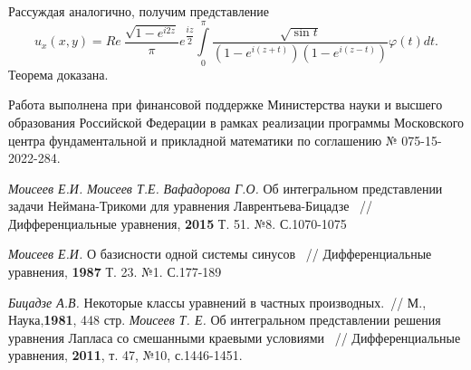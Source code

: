 \documentclass[a4paper, 9pt]{article}
\begin{document}
	 	Рассуждая аналогично, получим представление
	 		\begin{equation*}
	 			u_x(x,y) = Re\   \dfrac{ \sqrt{1 - e^{i2z}} }{\pi} e^{\dfrac{iz}{2}} \int\limits_0^\pi  \dfrac{\sqrt{\sin{t}}}{\left(1 - e^{i(z+t)} \right) \left(1 - e^{i(z-t)}\right)}  \varphi(t) dt.
	 		\end{equation*}
		Теорема доказана.
	\par
	Работа выполнена при финансовой поддержке Министерства науки и высшего образования Российской Федерации в рамках реализации программы Московского центра фундаментальной и прикладной математики по соглашению № 075-15-2022-284.
	\newline
	\newline
	\vspace{-2.3cm}
	\renewcommand{\refname}{\begin{center}
			{\normalsize \rm СПИСОК ЛИТЕРАТУРЫ} \end{center}}
	
	\begin{thebibliography}{99} \itemsep=-2pt \vspace{-0.8cm}
		
		
		 \textit{Моисеев Е.И.} \textit{Моисеев Т.Е.} \textit{Вафадорова Г.О.} Об интегральном представлении задачи Неймана-Трикоми для уравнения Лаврентьева-Бицадзе ~// Дифференциальные уравнения, \textbf{2015} Т. 51. №8. С.1070-1075
		
		 \textit{Моисеев Е.И.} О базисности одной системы синусов ~// Дифференциальные уравнения, \textbf{1987} Т. 23. №1. С.177-189
		
		 \textit{Бицадзе А.В.} Некоторые классы уравнений в частных производных.~// М., Наука,\textbf{1981}, 448 стр. 
		 \textit{Моисеев Т. Е.} Об интегральном представлении решения уравнения Лапласа со
		смешанными краевыми условиями ~// Дифференциальные уравнения, \textbf{2011}, т. 47, №10, с.1446-1451. 
	\end{thebibliography}
\end{document}
